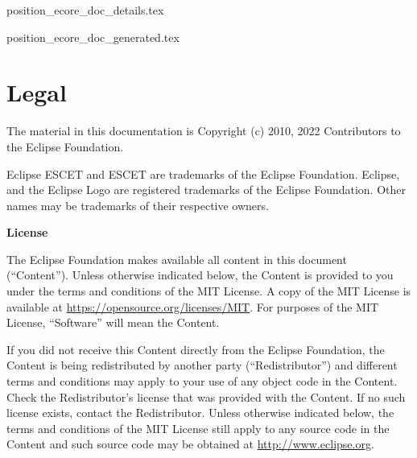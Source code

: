 \documentclass{report}
\begin{document}
\newpage


       {position_ecore_doc_details.tex}



       {position_ecore_doc_generated.tex}



\chapter{Legal}

The material in this documentation is
Copyright (c) 2010, 2022 Contributors to the Eclipse Foundation.

Eclipse ESCET and ESCET are trademarks of the Eclipse Foundation.
Eclipse, and the Eclipse Logo are registered trademarks of the
Eclipse Foundation. Other names may be trademarks of their
respective owners.

\textbf{License}

The Eclipse Foundation makes available all content in this document
(``Content''). Unless otherwise indicated below, the Content is provided to you
under the terms and conditions of the MIT License. A copy of the MIT License
is available at \url{https://opensource.org/licenses/MIT}. For purposes of the
MIT License, ``Software'' will mean the Content.

If you did not receive this Content directly from the Eclipse Foundation,
the Content is being redistributed by another party (``Redistributor'') and
different terms and conditions may apply to your use of any object code in
the Content. Check the Redistributor's license that was provided with the
Content. If no such license exists, contact the Redistributor. Unless
otherwise indicated below, the terms and conditions of the MIT License
still apply to any source code in the Content and such source code may be
obtained at \url{http://www.eclipse.org}.





\end{document}
